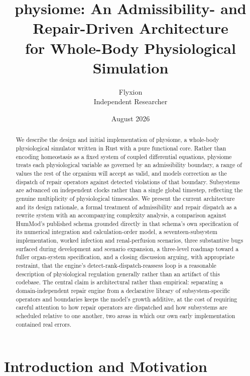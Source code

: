 \documentclass[11pt]{article}
\title{physiome: An Admissibility- and Repair-Driven Architecture\\
for Whole-Body Physiological Simulation}
\author{Flyxion \\ Independent Researcher}
\date{August 2026}
\begin{document}
\maketitle

\begin{abstract}
We describe the design and initial implementation of physiome, a whole-body physiological simulator written in Rust with a pure functional core. Rather than encoding homeostasis as a fixed system of coupled differential equations, physiome treats each physiological variable as governed by an admissibility boundary, a range of values the rest of the organism will accept as valid, and models correction as the dispatch of repair operators against detected violations of that boundary. Subsystems are advanced on independent clocks rather than a single global timestep, reflecting the genuine multiplicity of physiological timescales. We present the current architecture and its design rationale, a formal treatment of admissibility and repair dispatch as a rewrite system with an accompanying complexity analysis, a comparison against HumMod's published schema grounded directly in that schema's own specification of its numerical integration and calculation-order model, a seventeen-subsystem implementation, worked infection and renal-perfusion scenarios, three substantive bugs surfaced during development and scenario expansion, a three-level roadmap toward a fuller organ-system specification, and a closing discussion arguing, with appropriate restraint, that the engine's detect-rank-dispatch-reassess loop is a reasonable description of physiological regulation generally rather than an artifact of this codebase. The central claim is architectural rather than empirical: separating a domain-independent repair engine from a declarative library of subsystem-specific operators and boundaries keeps the model's growth additive, at the cost of requiring careful attention to how repair operators are dispatched and how subsystems are scheduled relative to one another, two areas in which our own early implementation contained real errors.
\end{abstract}

\section{Introduction and Motivation}
\label{sec:intro}
\end{document}
